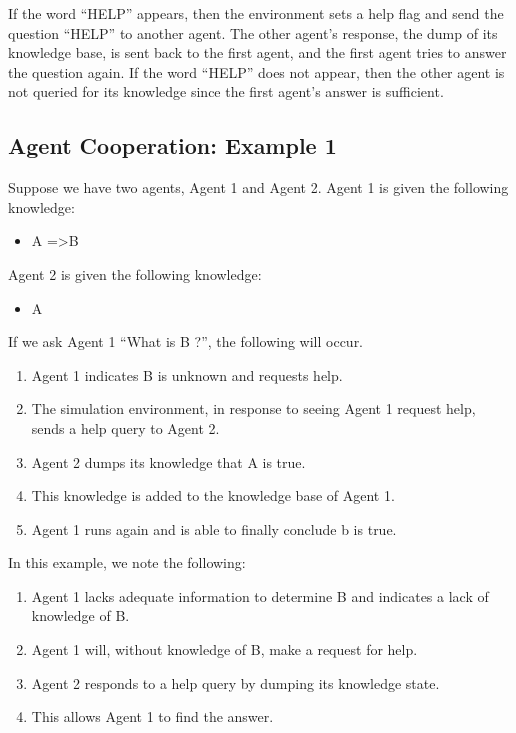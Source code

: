 \documentclass{article}
\begin{document}
If the word “HELP” appears, then the environment sets a help flag and send the question “HELP” to another agent. The other agent’s response, the dump of its knowledge base, is sent back to the first agent, and the first agent tries to answer the question again. If the word “HELP” does not appear, then the other agent is not queried for its knowledge since the first agent’s answer is sufficient.

\subsection{Agent Cooperation: Example 1}
\label{example_1}

Suppose we have two agents, Agent 1 and Agent 2. Agent 1 is given the following knowledge:

\begin{itemize}
	\item A =\textgreater B
\end{itemize}

Agent 2 is given the following knowledge:

\begin{itemize}
	\item A
\end{itemize}

If we ask Agent 1 “What is B ?”, the following will occur.

\begin{enumerate}
	\item Agent 1 indicates B is unknown and requests help.
	\item The simulation environment, in response to seeing Agent 1 request help, sends a help query to Agent 2.
	\item Agent 2 dumps its knowledge that A is true.
	\item This knowledge is added to the knowledge base of Agent 1.
	\item Agent 1 runs again and is able to finally conclude b is true.
\end{enumerate}

In this example, we note the following:

\begin{enumerate}
	\item Agent 1 lacks adequate information to determine B and indicates a lack of knowledge of B.
	\item Agent 1 will, without knowledge of B, make a request for help.
	\item Agent 2 responds to a help query by dumping its knowledge state.
	\item This allows Agent 1 to find the answer.
\end{enumerate}
\end{document}
